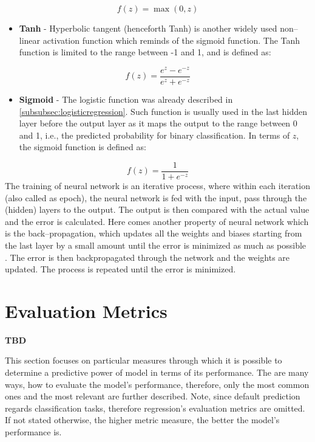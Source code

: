 \begin{equation}
    f(z) = \max(0,z)
\end{equation}
\begin{itemize}\setlength\itemsep{0cm}
    \item \textbf{Tanh} - Hyperbolic tangent (henceforth Tanh) is another widely used non--linear activation function which reminds of the sigmoid function. The Tanh function is limited to the range between -1 and 1, and is defined as:
    \end{itemize}
\begin{equation}
    f(z) = \frac{e^z - e^{-z}}{e^z + e^{-z}}
\end{equation}
\begin{itemize}\setlength\itemsep{0cm}
    \item \textbf{Sigmoid} - The logistic function was already described in \autoref{subsubsec:logisticregression}. Such function is usually used in the last hidden layer before the output layer as it maps the output to the range between 0 and 1, i.e., the predicted probability for binary classification. In terms of $z$, the sigmoid function is defined as:
    \end{itemize}
\begin{equation}
    f(z) = \frac{1}{1+e^{-z}}
\end{equation}
The training of neural network is an iterative process, where within each iteration (also called as epoch), the neural network is fed with the input, pass through the (hidden) layers to the output. The output is then compared with the actual value and the error is calculated.
Here comes another property of neural network which is the back--propagation, which updates all the weights and biases starting from the last layer by a small amount until the error is minimized as much as possible \citep{ayyadevara2018pro}.
The error is then backpropagated through the network and the weights are updated. The process is repeated until the error is minimized.

\section{Evaluation Metrics}

\textbf{TBD}

This section focuses on particular measures through which it is possible to determine a predictive power of model in terms of its performance.
The are many ways, how to evaluate the model's performance, therefore, only the most common ones and the most relevant are further described.
Note, since default prediction regards classification tasks, therefore regression's evaluation metrics are omitted.
If not stated otherwise, the higher metric measure, the better the model's performance is.
